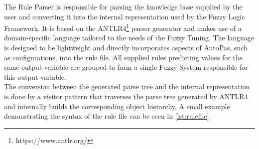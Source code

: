 The Rule Parser is responsible for parsing the knowledge base supplied by the user and converting it into the internal representation used by the Fuzzy Logic Framework. It is based on the ANTLR4\footnote{https://www.antlr.org/} parser generator and makes use of a domain-specific language tailored to the needs of the Fuzzy Tuning. The language is designed to be lightweight and directly incorporates aspects of AutoPas, such as configurations, into the rule file. All supplied rules predicting values for the same output variable are grouped to form a single Fuzzy System responsible for this output variable. \\
The conversion between the generated parse tree and the internal representation is done by a visitor pattern that traverses the parse tree generated by ANTLR4 and internally builds the corresponding object hierarchy.
A small example demonstrating the syntax of the rule file can be seen in \autoref{lst:rulefile}.

\smallskip

